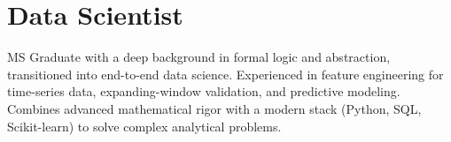 
\section{Data Scientist}

MS Graduate with a deep background in formal logic and abstraction, transitioned into end-to-end data science. Experienced in feature engineering for time-series data, expanding-window validation, and predictive modeling. Combines advanced mathematical rigor with a modern stack (Python, SQL, Scikit-learn) to solve complex analytical problems.
